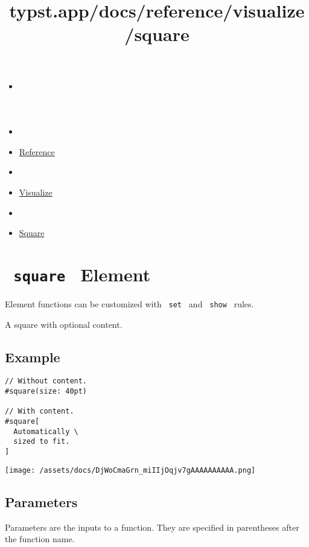 \title{typst.app/docs/reference/visualize/square}

\begin{itemize}
\tightlist
\item
  \href{/docs}{}
\item
  
\item
  \href{/docs/reference/}{Reference}
\item
  
\item
  \href{/docs/reference/visualize/}{Visualize}
\item
  
\item
  \href{/docs/reference/visualize/square/}{Square}
\end{itemize}

\section{\texorpdfstring{\texttt{\ square\ } {{ Element
}}}{ square   Element }}\label{summary}

\label{element-tooltip}
Element functions can be customized with \texttt{\ set\ } and
\texttt{\ show\ } rules.

A square with optional content.

\subsection{Example}\label{example}

\begin{verbatim}
// Without content.
#square(size: 40pt)

// With content.
#square[
  Automatically \
  sized to fit.
]
\end{verbatim}

\texttt{[image: /assets/docs/DjWoCmaGrn\_miIIjOqjv7gAAAAAAAAAA.png]}

\subsection{\texorpdfstring{{ Parameters
}}{ Parameters }}\label{parameters}

\label{parameters-tooltip}
Parameters are the inputs to a function. They are specified in
parentheses after the function name.


